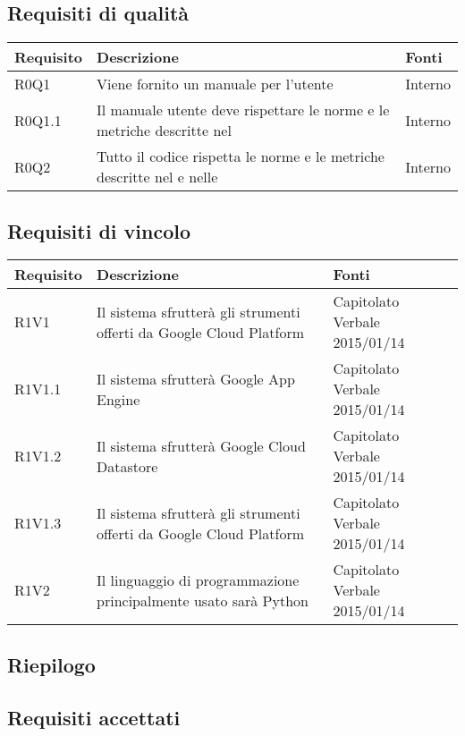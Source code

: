 \subsection{Requisiti di qualità}

\begin{center}

	\def\arraystretch{1.5}
	\bgroup
	\begin{longtable}{| p{2cm} | p{8cm} | p{2cm} |}

		\hline
		\textbf{Requisito} & \textbf{Descrizione} & \textbf{Fonti} \\
		\hline

		R0Q1  &  Viene fornito un manuale per l'utente  &  Interno \\
		\hline
		R0Q1.1  &  Il manuale utente deve rispettare le norme e le metriche descritte nel \docNameVersionPdQ  &  Interno \\
		\hline
		R0Q2  &  Tutto il codice rispetta le norme e le metriche descritte nel \docNameVersionPdQ{} e nelle \docNameVersionNdP  &  Interno \\
		\hline


	\end{longtable}
	\egroup
\end{center}

\subsection{Requisiti di vincolo}

\begin{center}

	\def\arraystretch{1.5}
	\bgroup
	\begin{longtable}{| p{2cm} | p{8cm} | p{2cm} |}

		\hline
		\textbf{Requisito} & \textbf{Descrizione} & \textbf{Fonti} \\
		\hline

		R1V1  &  Il sistema sfrutterà gli strumenti offerti da Google Cloud Platform  &  Capitolato \newline Verbale 2015/01/14 \\
		\hline
		R1V1.1  &  Il sistema sfrutterà Google App Engine  &  Capitolato \newline Verbale 2015/01/14 \\
		\hline
		R1V1.2  &  Il sistema sfrutterà Google Cloud Datastore  &  Capitolato \newline Verbale 2015/01/14 \\
		\hline
		R1V1.3  &  Il sistema sfrutterà gli strumenti offerti da Google Cloud Platform  &  Capitolato \newline Verbale 2015/01/14 \\
		\hline
		R1V2  &  Il linguaggio di programmazione principalmente usato sarà Python  &  Capitolato \newline Verbale 2015/01/14 \\
		\hline

	\end{longtable}
	\egroup
\end{center}

\subsection{Riepilogo}

\subsection{Requisiti accettati}
